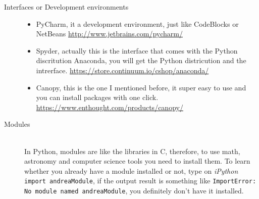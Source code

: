 \documentclass[11pt,fleqn]{book} %
\begin{document}
\begin{description}
																																																																																							        \begin{description}
																																																																																								    	\item[Interfaces or Development environments]\hfill
																																																																																									        	\begin{itemize}
																																																																																											            	\item PyCharm, it a development environment, just like CodeBlocks or NetBeans \url{http://www.jetbrains.com/pycharm/}
																																																																																													                \item Spyder, actually this is the interface that comes with the Python discritution Anaconda, you will get the Python districution and the intrerface. \url{https://store.continuum.io/cshop/anaconda/}
																																																																																															                \item Canopy, this is the one I mentioned before, it super easy to use and you can install packages with one click. \url{https://www.enthought.com/products/canopy/}
																																																																																																	            \end{itemize}
																																																																																																		            \item[Modules]\hfill
																																																																																																			            \\
																																																																																																				            In Python, modules are like the libraries in C, therefore, to use math, astronomy and computer science tools you need to install them. To learn whether you already have a module installed or not, type on \emph{iPython} \verb|import andreaModule|, if the output result is something like \verb|ImportError: No module named andreaModule|, you definitely don't have it installed. 
																																																																																																					            

\end{description}
\end{description}
\end{document}
